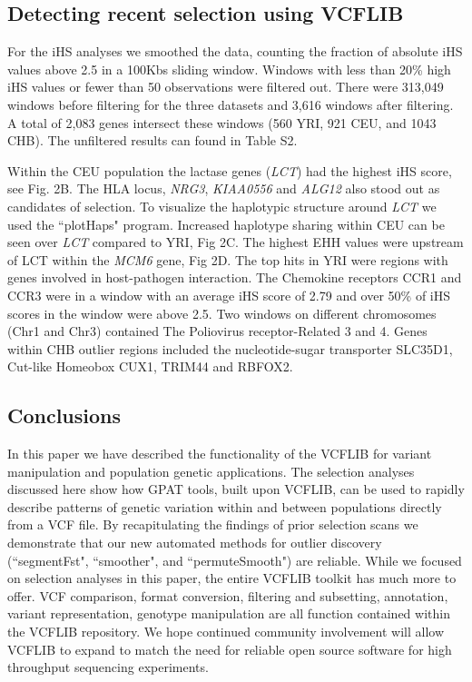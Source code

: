 \documentclass[10pt,letterpaper]{article}
\begin{document}
\subsection*{Detecting recent selection using VCFLIB}

For the iHS analyses we smoothed the data, counting the fraction of absolute iHS values above 2.5 in a 100Kbs sliding window.  Windows with less than 20\% high iHS values or fewer than 50 observations were filtered out. There were 313,049 windows before filtering for the three datasets and 3,616 windows after filtering.  A total of 2,083 genes intersect these windows (560 YRI, 921 CEU, and 1043 CHB).  The unfiltered results can found in Table S2. 

Within the CEU population the lactase genes (\textit{LCT}) had the highest iHS score, see Fig. 2B.  The HLA locus, \textit{NRG3}, \textit{KIAA0556} and \textit{ALG12} also stood out as candidates of selection.  To visualize the haplotypic structure around \textit{LCT} we used the ``plotHaps" program.  Increased haplotype sharing within CEU can be seen over \textit{LCT} compared to YRI, Fig 2C.  The highest EHH values were upstream of LCT within the \textit{MCM6} gene, Fig 2D.  The top hits in YRI were regions with genes involved in host-pathogen interaction.  The Chemokine receptors CCR1 and CCR3 were in a window with an average iHS score of 2.79 and over 50\% of iHS scores in the window were above 2.5. Two windows on different chromosomes  (Chr1 and Chr3) contained The Poliovirus receptor-Related 3 and 4.  Genes within CHB outlier regions included the nucleotide-sugar transporter SLC35D1, Cut-like Homeobox CUX1, TRIM44 and RBFOX2.

\subsection*{Conclusions}

In this paper we have described the functionality of the VCFLIB for variant manipulation and population genetic applications.  The selection analyses discussed here show how GPAT tools, built upon VCFLIB, can be used to rapidly describe patterns of genetic variation within and between populations directly from a VCF file.  By recapitulating the findings of prior selection scans we demonstrate that our new automated methods for outlier discovery (``segmentFst", ``smoother", and ``permuteSmooth") are reliable.  While we focused on selection analyses in this paper, the entire VCFLIB toolkit has much more to offer. VCF comparison, format conversion, filtering and subsetting, annotation, variant representation, genotype manipulation are all function contained within the VCFLIB repository.  We hope continued community involvement will allow VCFLIB to expand to match the need for reliable open source software for high throughput sequencing experiments. 
\end{document}
